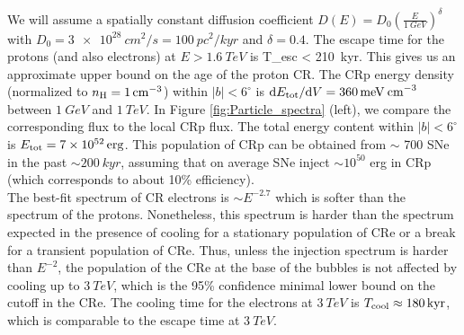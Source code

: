 We will assume a spatially constant diffusion coefficient $D(E) = D_0\left(\frac{E}{\SI{1}{GeV}}\right)^\delta$ with $D_0 = \SI{3e28}{cm^2/s} = \SI{100}{pc^2/kyr}$ and $\delta = 0.4$.
The escape time for the protons (and also electrons) at $E > \SI{1.6}{TeV}$ is 
\be
T_{\rm esc} <  \approx \SI{210}{kyr}.
\ee
This gives us an approximate upper bound on the age of the proton CR.
The CRp energy density (normalized to $n_{\text{H}} = \SI{1}{cm^{-3}}$) within $|b| < 6^\circ$ is 
$\text{d} E_{\text{tot}} / \text{d} V = \SI{360}{meV\: cm^{-3}}$ between $\SI{1}{GeV}$ and $\SI{1}{TeV}$.
In Figure \ref{fig:Particle_spectra} (left), we compare the corresponding flux to the local CRp flux.
The total energy content within $|b| < 6^\circ$ is $E_{\text{tot}} = \SI{7e52}{erg}$.
This population of CRp can be obtained from $\sim$ 700 SNe in the past $\sim \SI{200}{kyr}$, 
assuming that on average SNe inject $\sim 10^{50}$ erg in CRp (which corresponds to about 10\% efficiency).
\\


The best-fit spectrum of CR electrons is $\sim E^{-2.7}$ which is softer than the spectrum of the protons.
Nonetheless, this spectrum is harder than the spectrum expected in the presence of cooling
for a stationary population of CRe or a break for a transient population of CRe.
Thus, unless the injection spectrum is harder than $E^{-2}$, the population of the CRe at the base of the 
bubbles is not affected by cooling up to $\SI{3}{TeV}$,
which is the 95\% confidence minimal lower bound on the cutoff in the CRe. 
The cooling time for the electrons at %
$\SI{3}{TeV}$ is $T_{\rm cool} \approx \SI{180}{kyr}$,
which is comparable to the escape time at $\SI{3}{TeV}$.

